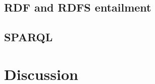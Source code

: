 \documentclass[runningheads,a4paper]{../../StyleFiles/llncs}
\begin{document}
\subsection{RDF and RDFS entailment}


\subsection{SPARQL}



\section{Discussion}



\end{document}
